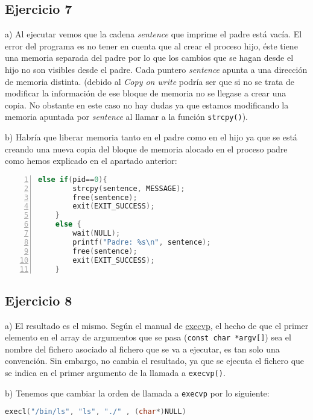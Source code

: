 \documentclass{article}
\begin{document}
\subsection*{Ejercicio 7}

a) Al ejecutar vemos que la cadena \textit{sentence} que imprime el padre está vacía. El error del programa es no tener en cuenta que al crear el proceso hijo, éste tiene una memoria separada del padre  por lo que los cambios que se hagan desde el hijo no son visibles desde el padre. Cada puntero \textit{sentence} apunta a una dirección de memoria distinta.
(debido al \textit{Copy on write} podría ser que si no se trata de modificar la información de ese bloque de memoria no se llegase a crear una copia. No obstante en este caso no hay dudas ya que estamos modificando la memoria apuntada por \textit{sentence} al llamar a la función \texttt{strcpy()}).

b) Habría que liberar memoria tanto en el padre como en el hijo ya que se está creando una nueva copia del bloque de memoria alocado en el proceso padre como hemos explicado en el apartado anterior:

\begin{lstlisting}[language=C, numbers=left]
    else if(pid==0){
        strcpy(sentence, MESSAGE);
        free(sentence);
        exit(EXIT_SUCCESS);
    }
    else {
        wait(NULL);
        printf("Padre: %s\n", sentence);
        free(sentence);
        exit(EXIT_SUCCESS);
    }
\end{lstlisting}



\subsection*{Ejercicio 8}

a) El resultado es el mismo. Según el manual de \href{man:execvp(3)}{execvp}, el hecho de que el primer elemento en el array de argumentos que se pasa (\texttt{const char *argv[]}) sea el nombre del fichero asociado al fichero que se va a ejecutar, es tan solo una convención. Sin embargo, no cambia el resultado, ya que se ejecuta el fichero que se indica en el primer argumento de la llamada a \texttt{execvp()}.

b) Tenemos que cambiar la orden de llamada a \texttt{execvp} por lo siguiente:

\begin{lstlisting}[language=C]
    execl("/bin/ls", "ls", "./" , (char*)NULL)
\end{lstlisting}
\end{document}
